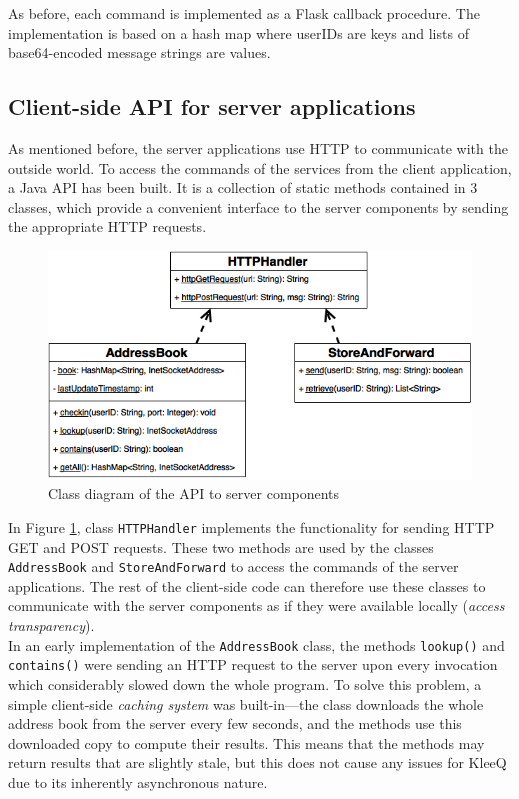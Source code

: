 \documentclass[a4paper, twoside, 12pt]{report}
\begin{document}
As before, each command is implemented as a Flask callback procedure. The implementation is based on a hash map where userIDs are keys and lists of base64-encoded message strings are values.


\subsection{Client-side API for server applications}
\label{subsec:impl.prep.API}
As mentioned before, the server applications use HTTP to communicate with the outside world. To access the commands of the services from the client application, a Java API has been built. It is a collection of static methods contained in 3 classes, which provide a convenient interface to the server components by sending the appropriate HTTP requests.

\begin{figure}[H]
    \centering
    \includegraphics[width = 0.8 \linewidth]{pics/scaffolding_uml.png}
    \caption{\label{fig:scaffolding_uml} Class diagram of the API to server components}
\end{figure}
In Figure \ref{fig:scaffolding_uml}, class \texttt{HTTPHandler} implements the functionality for sending HTTP GET and POST requests. These two methods are used by the classes \texttt{AddressBook} and \texttt{StoreAndForward} to access the commands of the server applications. The rest of the client-side code can therefore use these classes to communicate with the server components as if they were available locally (\emph{access transparency}). \\

In an early implementation of the \texttt{AddressBook} class, the methods \texttt{lookup()} and \texttt{contains()} were sending an HTTP request to the server upon every invocation which considerably slowed down the whole program. To solve this problem, a simple client-side \emph{caching system} was built-in---the class downloads the whole address book from the server every few seconds, and the methods use this downloaded copy to compute their results. This means that the methods may return results that are slightly stale, but this does not cause any issues for KleeQ due to its inherently asynchronous nature. \\
\end{document}
